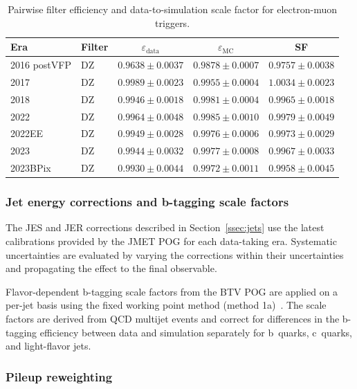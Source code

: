 \begin{table}[htbp]
\centering
\caption{Pairwise filter efficiency and data-to-simulation scale factor for electron-muon triggers.}
\label{tab:pair_emu}
\small
\begin{tabular}{llccc}
\hline\hline
Era & Filter & $\varepsilon_\text{data}$ & $\varepsilon_\text{MC}$ & SF \\
\hline
2016 postVFP & DZ & $0.9638 \pm 0.0037$ & $0.9878 \pm 0.0007$ & $0.9757 \pm 0.0038$ \\
2017         & DZ & $0.9989 \pm 0.0023$ & $0.9955 \pm 0.0004$ & $1.0034 \pm 0.0023$ \\
2018         & DZ & $0.9946 \pm 0.0018$ & $0.9981 \pm 0.0004$ & $0.9965 \pm 0.0018$ \\
2022         & DZ & $0.9964 \pm 0.0048$ & $0.9985 \pm 0.0010$ & $0.9979 \pm 0.0049$ \\
2022EE       & DZ & $0.9949 \pm 0.0028$ & $0.9976 \pm 0.0006$ & $0.9973 \pm 0.0029$ \\
2023         & DZ & $0.9944 \pm 0.0032$ & $0.9977 \pm 0.0008$ & $0.9967 \pm 0.0033$ \\
2023BPix     & DZ & $0.9930 \pm 0.0044$ & $0.9972 \pm 0.0011$ & $0.9958 \pm 0.0045$ \\
\hline\hline
\end{tabular}
\end{table}

\subsubsection*{Jet energy corrections and b-tagging scale factors}

The JES and JER corrections described in Section~\ref{ssec:jets} use the latest calibrations provided by the JMET POG for each data-taking era. Systematic uncertainties are evaluated by varying the corrections within their uncertainties and propagating the effect to the final observable.

Flavor-dependent b-tagging scale factors from the BTV POG are applied on a per-jet basis using the fixed working point method (method 1a)~\cite{CMS:2017wtu}. The scale factors are derived from QCD multijet events and correct for differences in the b-tagging efficiency between data and simulation separately for b~quarks, c~quarks, and light-flavor jets.

\subsubsection*{Pileup reweighting}

